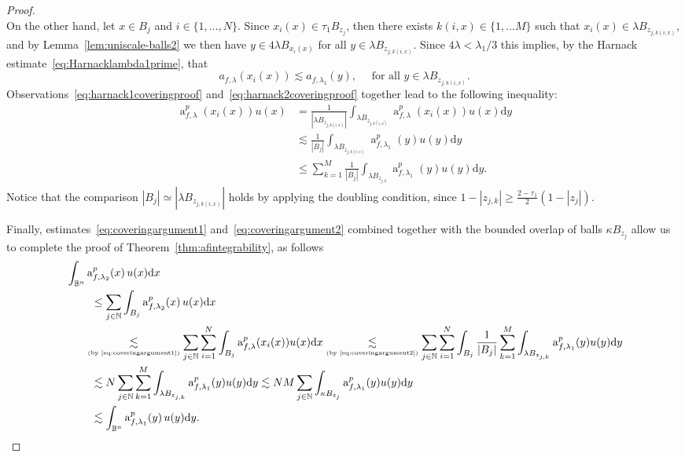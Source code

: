 \documentclass[11pt,a4paper,reqno]{amsart}
\theoremstyle{definition}
\renewcommand{\a}{\operatorname{a}}
\newcommand{\B}{\mathbb{B}^n}
\newcommand{\N}{\mathbb{N}}
\newcommand{\ud}{\mathrm {d}}
\numberwithin{komcounter}{section}
\begin{document}
\begin{proof}
\begin{equation}
\end{equation}
On the other hand, let $x\in B_j$ and $i\in \{ 1,\dots , N\}$. Since $x_i(x)\in \tau_1 B_{z_j}$, then there exists $k(i,x)\in\{ 1,\dots M\}$ such that $x_i(x)\in \lambda B_{z_{j,k(i,x)}}$, and by Lemma~\ref{lem:uniscale-balls2} we then have $y\in 4\lambda B_{x_i (x)}$ for all $y\in \lambda B_{z_{j,k(i,x)}}$. Since $4\lambda < \lambda_1 /3$ this implies, by the Harnack estimate~\eqref{eq:Harnacklambda1prime}, that
\begin{equation}\label{eq:harnack2coveringproof}
	a_{f,\lambda}(x_i(x))\lesssim a_{f,\lambda_1}(y),\quad \mbox{ for all }y\in \lambda B_{z_{j,k(i,x)}}.
\end{equation}
Observations~\eqref{eq:harnack1coveringproof} and~\eqref{eq:harnack2coveringproof} together lead to the following inequality:
\begin{align}
\a^p_{f,\lambda}(x_i(x))u(x)&=\frac{1}{|\lambda B_{z_{j,k(i,x)}}|}\int_{\lambda B_{z_{j,k(i,x)}}}\a^p_{f,\lambda}(x_i(x))u(x)\ud y \nonumber \\
	&\lesssim \frac{1}{|B_j|}\int_{\lambda B_{z_{j,k(i,x)}}}\a^p_{f,\lambda_1}(y)u(y)\ud y \nonumber \\
	& \leq \sum_{k=1}^M \frac{1}{|B_j|}\int_{\lambda B_{z_{j,k}}}\a^p_{f,\lambda_1}(y)u(y)\ud y. \label{eq:coveringargument2}
\end{align}
Notice that the comparison $|B_j|\simeq |\lambda B_{z_{j,k(i,x)}}|$ holds by applying the doubling condition, since $1-|z_{j,k}|\geq \frac{2-\tau_1}{2}(1-|z_j|)$. 

Finally, estimates~\eqref{eq:coveringargument1} and~\eqref{eq:coveringargument2} combined together with the bounded overlap of balls $\kappa B_{z_j}$ allow us to complete the proof of Theorem~\ref{thm:afintegrability}, as follows
\begin{align*} 
  &\int_{\B}\a^p_{f,\lambda_2}(x)\,u(x)\ud x \\
   &\phantom{AAA}\leq \sum_{j\in\N}\int_{B_j}\a^p_{f,\lambda_2}(x)\,u(x)\ud x   \\
   &\phantom{AA\,}\underset{\hbox{\tiny{(by~\eqref{eq:coveringargument1})}}}{\lesssim} \sum_{j\in\N} \sum_{i=1}^N \int_{B_j} \a^p_{f,\lambda} (x_i(x))u(x)\ud x \underset{\hbox{\tiny{(by~\eqref{eq:coveringargument2})}}}{\lesssim} \sum_{j\in\N}   \sum_{i=1}^N\int_{B_j}\frac{1}{|B_j|}\sum_{k=1}^M\int_{\lambda B_{z_{j,k}}} \a_{f,\lambda_1}^p (y)u(y)\ud y\\
    &\phantom{AAA}\lesssim N \sum_{j\in\N} \sum_{k=1}^M\int_{\lambda B_{z_{j,k}}} \a_{f,\lambda_1}^p (y)u(y)\ud y\lesssim NM\sum_{j\in\N}\int_{\kappa B_{z_j}} \a_{f,\lambda_1}^p (y)u(y)\ud y \\
    &\phantom{AAA}\lesssim \int_{\B}\a_{f,\lambda_1}^p(y)\, u(y)\ud y.
\end{align*}
\end{proof}
\end{document}
